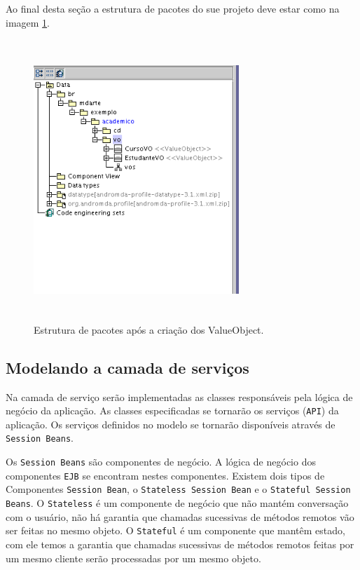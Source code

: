 Ao final desta seção a estrutura de pacotes do sue projeto deve estar como na
imagem \ref{pacotes_value_object}.
\begin{figure}[H]
	\centering
	\includegraphics[width=220pt,height=300pt]{imgs/tutorial-mdarte-0024.png}
	\caption{Estrutura de pacotes após a criação dos ValueObject.}
	\label{pacotes_value_object}
\end{figure}

\subsection{Modelando a camada de serviços}

Na camada de serviço serão implementadas as classes responsáveis pela lógica de
negócio da aplicação. As classes especificadas se tornarão os serviços
(\texttt{API}) da aplicação. Os serviços definidos no modelo se tornarão
disponíveis através de \texttt{Session Beans}.

Os \texttt{Session Beans} são componentes de negócio. A lógica de negócio dos
componentes \texttt{EJB} se encontram nestes componentes. Existem dois tipos de
Componentes \texttt{Session Bean}, o \texttt{Stateless Session Bean} e o
\texttt{Stateful Session Beans}. O \texttt{Stateless} é um componente de negócio
que não mantém conversação com o usuário, não há garantia que chamadas
sucessivas de métodos remotos vão ser feitas no mesmo objeto. O
\texttt{Stateful} é um componente que mantêm estado, com ele temos a garantia
que chamadas sucessivas de métodos remotos feitas por um mesmo cliente serão
processadas por um mesmo objeto.

